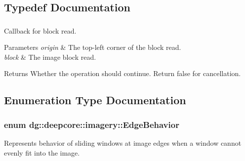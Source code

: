 \subsection{Typedef Documentation}
\subsubsection[{\texorpdfstring{Block\+Read\+Func}{BlockReadFunc}}]{}\hypertarget{group___imagery_module_ga2238c2ef34502f68956ddef1f477ad95}{}\label{group___imagery_module_ga2238c2ef34502f68956ddef1f477ad95}


Callback for block read. 


\begin{DoxyParams}{Parameters}
{\em origin} & The top-\/left corner of the block read. \\
\hline
{\em block} & The image block read. \\
\hline
\end{DoxyParams}
\begin{DoxyReturn}{Returns}
Whether the operation should continue. Return false for cancellation. 
\end{DoxyReturn}


\subsection{Enumeration Type Documentation}
\subsubsection[{\texorpdfstring{Edge\+Behavior}{EdgeBehavior}}]{\setlength{\rightskip}{0pt plus 5cm}enum {\bf dg\+::deepcore\+::imagery\+::\+Edge\+Behavior}\hspace{0.3cm}{\ttfamily [strong]}}\hypertarget{group___imagery_module_gaf813556adc6cfc1daa1ee410d7c84a17}{}\label{group___imagery_module_gaf813556adc6cfc1daa1ee410d7c84a17}


Represents behavior of sliding windows at image edges when a window cannot evenly fit into the image. 

